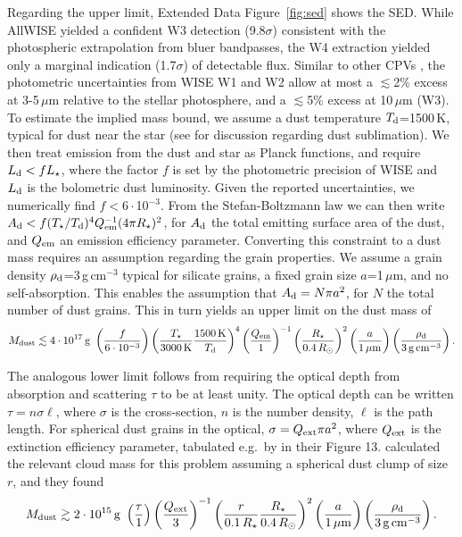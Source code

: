\documentclass{nature3}
\begin{document}
\begin{methods}
Regarding the upper limit, Extended Data Figure~\ref{fig:sed} shows
the SED.  While AllWISE \cite{Cutri2014} yielded a confident W3
detection (9.8$\sigma$) consistent with the photospheric extrapolation
from bluer bandpasses, the W4 extraction yielded only a marginal
indication (1.7$\sigma$) of detectable flux.  Similar to other CPVs
\cite{Stauffer2017,Bouma2024}, the photometric uncertainties from WISE
W1 and W2 allow at most a $\lesssim$2\% excess at 3-5\,$\mu$m relative
to the stellar photosphere, and a $\lesssim$5\% excess at 10\,$\mu$m
(W3).  To estimate the implied mass bound, we assume a dust
temperature $T_{\rm d}$=1500\,K, typical for dust near the star (see
\cite{Zhan2019} for discussion regarding dust sublimation).  We then
treat emission from the dust and star as Planck functions, and require
$L_{\rm d} < f L_\star$, where the factor $f$ is set by the
photometric precision of WISE and $L_{\rm d}$ is the bolometric dust
luminosity.  Given the reported uncertainties, we numerically find
$f<6\cdot$10$^{-3}$.  From the Stefan-Boltzmann law we can then write
$A_{\rm d} < f (T_\star / T_{\rm d})^4 Q_{\rm em}^{-1} (4\pi
R_\star)^2$, for $A_{\rm d}$ the total emitting surface area of the
dust, and $Q_{\rm em}$ an emission efficiency parameter.  Converting
this constraint to a dust mass requires an assumption regarding the
grain properties.  We assume a grain density $\rho_{\rm
d}$=3\,g\,cm$^{-3}$ typical for silicate grains, a fixed grain size
$a$=1\,$\mu$m, and no self-absorption.  This enables the assumption
that $A_{\rm d} = N \pi a^2$, for $N$ the total number of dust grains.
This in turn yields an upper limit on the dust mass of
\begin{equation}
  M_{\rm dust} \lesssim 4 \cdot 10^{17}\, {\rm g}\ 
  \left( \frac{f}{6\cdot10^{-3}} \right)
  \left( \frac{T_\star}{3000\,{\rm K}} \frac{1500\,{\rm K}}{T_{\rm d}} \right)^4
  \left( \frac{Q_{\rm em}}{1} \right)^{-1}
  \left( \frac{R_\star}{0.4\,R_\odot} \right)^2
  \left( \frac{a}{1\,\mathrm{\mu m}} \right)
  \left( \frac{\rho_{\rm d}}{3\,\mathrm{g\,cm^{-3}}} \right).
\end{equation}

The analogous lower limit follows from requiring the optical depth
from absorption and scattering $\tau$ to be at least unity.  The
optical depth can be written $\tau = n \sigma \ell$, where $\sigma$ is
the cross-section, $n$ is the number density, $\ell$ is the path
length.  For spherical dust grains in the optical, $\sigma = Q_{\rm
ext} \pi a^2$, where $Q_{\rm ext}$ is the extinction efficiency
parameter, tabulated e.g.~by \cite{Croll2014} in their Figure 13.
\cite{Sanderson2023} calculated the relevant cloud mass for this
problem assuming a spherical dust clump of size $r$, and they found
\begin{equation}
  M_{\rm dust} \gtrsim 2 \cdot 10^{15}\, {\rm g}\ 
  \left( \frac{\tau}{1} \right)
  \left( \frac{Q_{\rm ext}}{3} \right)^{-1}
  \left( \frac{r}{0.1\,R_\star} \frac{R_\star}{0.4\,R_\odot} \right)^2
  \left( \frac{a}{1\,\mathrm{\mu m}} \right)
  \left( \frac{\rho_{\rm d}}{3\,\mathrm{g\,cm^{-3}}} \right).
\end{equation}


\end{methods}
\end{document}
